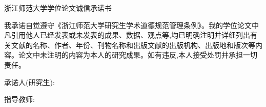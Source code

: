 \newcommand{\ZJNUcommitment}{%
\newpage

\hfill \centerline{浙江师范大学学位论文诚信承诺书} \hfill

我承诺自觉遵守《浙江师范大学研究生学术道德规范管理条例》。我的学位论文中凡引用他人已经发表或未发表的成果、数据、观点等,均已明确注明并详细列出有关文献的名称、作者、年份、刊物名称和出版文献的出版机构、出版地和版次等内容。论文中未注明的内容为本人的研究成果。如有违反,本人接受处罚并承担一切责任。  

\hfill 承诺人(研究生):

\hfill 指导教师:
}


\ZJNUcommitment